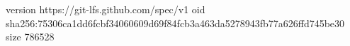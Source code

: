 version https://git-lfs.github.com/spec/v1
oid sha256:75306ca1dd6fcbf34060609d69f84fcb3a463da5278943fb77a626ffd745be30
size 786528
